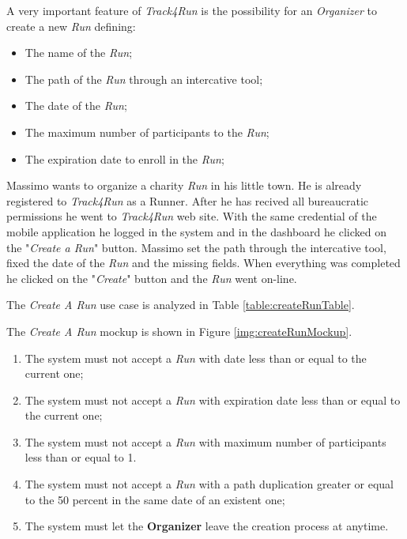 A very important feature of \textit{Track4Run} is the possibility for an \textit{Organizer} to create a new \textit{Run} defining:
\begin{itemize}
  \item The name of the \textit{Run};
  \item The path of the \textit{Run} through an intercative tool;
  \item The date of the \textit{Run};
  \item The maximum number of participants to the \textit{Run};
  \item The expiration date to enroll in the \textit{Run};
\end{itemize}

Massimo wants to organize a charity \textit{Run} in his little town. He is already registered to \textit{Track4Run} as a Runner. After he has recived all bureaucratic permissions he went to \textit{Track4Run} web site.
With the same credential of the mobile application he logged in the system and in the dashboard he clicked on the "\textit{Create a Run}" button. Massimo set the path through the intercative tool, fixed the date of the \textit{Run} and the missing fields. When everything was completed he clicked on the "\textit{Create}" button and the \textit{Run} went on-line.

The \textit{Create A Run} use case is analyzed in Table \ref{table:createRunTable}.

The \textit{Create A Run} mockup is shown in Figure \ref{img:createRunMockup}.

\begin{enumerate}
  \item The system must not accept a \textit{Run} with date less than or equal to the current one;
  \item The system must not accept a \textit{Run} with expiration date less than or equal to the current one;
  \item The system must not accept a \textit{Run} with maximum number of participants less than or equal to 1.
  \item The system must not accept a \textit{Run} with a path duplication greater or equal to the 50 percent in the same date of an existent one;
  \item The system must let the \textbf{Organizer} leave the creation process at anytime.
\end{enumerate}

